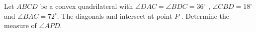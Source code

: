 Let $ABCD$ be a convex quadrilateral with $\angle{DAC}= \angle{BDC}= 36^\circ$ , $\angle{CBD}= 18^\circ$ and $\angle{BAC}= 72^\circ$. The diagonals and intersect at point $P$ . Determine the measure of $\angle{APD}$.